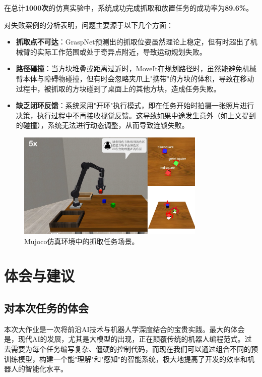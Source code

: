 \documentclass{article}
\begin{document}
\begin{CJK*}{UTF8}{gbsn}
在总计\textbf{1000次}的仿真实验中，系统成功完成抓取和放置任务的成功率为\textbf{89.6\%}。

对失败案例的分析表明，问题主要源于以下几个方面：
\begin{itemize}
    \item   \textbf{抓取点不可达}：GraspNet预测出的抓取位姿虽然理论上稳定，但有时超出了机械臂的实际工作范围或处于奇异点附近，导致运动规划失败。
    \item   \textbf{路径碰撞}：当方块堆叠或距离过近时，MoveIt在规划路径时，虽然能避免机械臂本体与障碍物碰撞，但有时会忽略夹爪上"携带"的方块的体积，导致在移动过程中，被抓取的方块碰到了桌面上的其他方块，造成任务失败。
    \item   \textbf{缺乏闭环反馈}：系统采用"开环"执行模式，即在任务开始时拍摄一张照片进行决策，执行过程中不再接收视觉反馈。这导致如果中途发生意外（如上文提到的碰撞），系统无法进行动态调整，从而导致连锁失败。
\end{itemize}

\begin{figure}[h!]
    \centering
    \includegraphics[width=0.8\textwidth]{image/report/fig_mujoco_simulation.png}
    \caption{Mujoco仿真环境中的抓取任务场景。}
    \label{fig:sim}
\end{figure}

\section{体会与建议}

\subsection{对本次任务的体会}

本次大作业是一次将前沿AI技术与机器人学深度结合的宝贵实践。最大的体会是，现代AI的发展，尤其是大模型的出现，正在颠覆传统的机器人编程范式。过去需要为每个任务编写复杂、僵硬的控制代码，而现在我们可以通过组合不同的预训练模型，构建一个能"理解"和"感知"的智能系统，极大地提高了开发的效率和机器人的智能化水平。


\end{CJK*}
\end{document}
